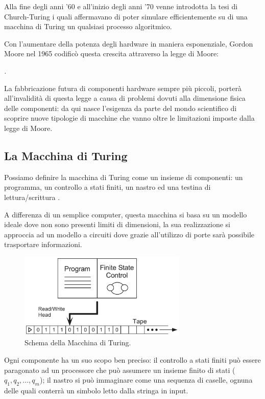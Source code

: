 Alla fine degli anni '60 e all'inizio degli anni '70 venne introdotta la tesi di Church-Turing i quali affermavano di poter simulare efficientemente su di una macchina di Turing un qualsiasi processo algoritmico.

Con l'aumentare della potenza degli hardware in maniera esponenziale, Gordon Moore nel 1965 codificò questa crescita attraverso la legge di Moore:
\begin{center}
\textit{ \cite{moore2006articolo}.}
\end{center}

La fabbricazione futura di componenti hardware sempre più piccoli, porterà all'invalidità di questa legge a causa di problemi dovuti alla dimensione fisica delle componenti: da qui nasce l'esigenza da parte del mondo scientifico di scoprire nuove tipologie di macchine che vanno oltre le limitazioni imposte dalla legge di Moore.

\subsection{La Macchina di Turing}
Possiamo definire la macchina di Turing come un insieme di componenti: un programma, un controllo a stati finiti, un nastro ed una testina di lettura/scrittura \cite{turing_machine2014articolo}.

A differenza di un semplice computer, questa macchina si basa su un modello ideale dove non sono presenti limiti di dimensioni, la sua realizzazione si approccia ad un modello a circuiti dove grazie all'utilizzo di porte sarà possibile trasportare informazioni.
\begin{figure}[htp]
    \centering
    \includegraphics[width=8cm]{Images/Capitolo1/macchina_turing.png}
    \caption{Schema della Macchina di Turing.}
    \label{fig:macchina_turing}
\end{figure}
\newline
Ogni componente ha un suo scopo ben preciso: il controllo a stati finiti può essere paragonato ad un processore che può assumere un insieme finito di stati ($q_1, q_2, ..., q_m$); il nastro si può immaginare come una sequenza di caselle, ognuna delle quali conterrà un simbolo letto dalla stringa in input.


